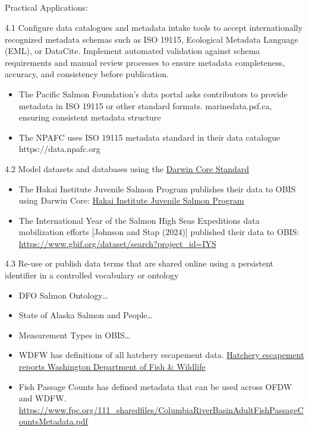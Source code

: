 \documentclass[
  letterpaper,
  DIV=11,
  numbers=noendperiod]{scrartcl}
\makeatletter
\let\oldsubparagraph\subparagraph
\renewcommand{\subparagraph}{
    \@ifstar
      \xxxSubParagraphStar
      \xxxSubParagraphNoStar
  }
\newcommand{\xxxSubParagraphStar}[1]{\oldsubparagraph*{#1}\mbox{}}
\newcommand{\xxxSubParagraphNoStar}[1]{\oldsubparagraph{#1}\mbox{}}
\providecommand{\tightlist}{%
  \setlength{\itemsep}{0pt}\setlength{\parskip}{0pt}}\usepackage{longtable,booktabs,array}
\makeatother
\begin{document}
\subparagraph{Practical Applications:}\label{practical-applications-3}

4.1 Configure data catalogues and metadata intake tools to accept
internationally recognized metadata schemas such as ISO 19115,
Ecological Metadata Language (EML), or DataCite. Implement automated
validation against schema requirements and manual review processes to
ensure metadata completeness, accuracy, and consistency before
publication.

\begin{itemize}
\tightlist
\item
  The Pacific Salmon Foundation's data portal asks contributors to
  provide metadata in ISO 19115 or other standard formats.
  marinedata.psf.ca, ensuring consistent metadata structure
\item
  The NPAFC uses ISO 19115 metadata standard in their data catalogue
  https://data.npafc.org
\end{itemize}

4.2 Model datasets and databases using the
\href{https://dwc.tdwg.org/}{Darwin Core Standard}

\begin{itemize}
\item
  The Hakai Institute Juvenile Salmon Program publishes their data to
  OBIS using Darwin Core:
  \href{https://www.gbif.org/dataset/72de3af4-1572-4f2d-8006-2bfa2007065c}{Hakai
  Institute Juvenile Salmon Program}
\item
  The International Year of the Salmon High Seas Expeditions data
  mobilization efforts {[}Johnson and Stap (2024){]} published their
  data to OBIS: \url{https://www.gbif.org/dataset/search?project_id=IYS}
\end{itemize}

4.3 Re-use or publish data terms that are shared online using a
persistent identifier in a controlled vocabulary or ontology

\begin{itemize}
\item
  DFO Salmon Ontology\ldots{}
\item
  State of Alaska Salmon and People\ldots{}
\item
  Measurement Types in OBIS\ldots{}
\item
  WDFW has definitions of all hatchery escapement data.
  \href{https://wdfw.wa.gov/fishing/management/hatcheries/escapement\#definitions}{Hatchery
  escapement reports \textbar{} Washington Department of Fish \&
  Wildlife}
\item
  Fish Passage Counts has defined metadata that can be used across OFDW
  and WDFW.
  \url{https://www.fpc.org/111_sharedfiles/ColumbiaRiverBasinAdultFishPassageCountsMetadata.pdf}
\end{itemize}
\end{document}
